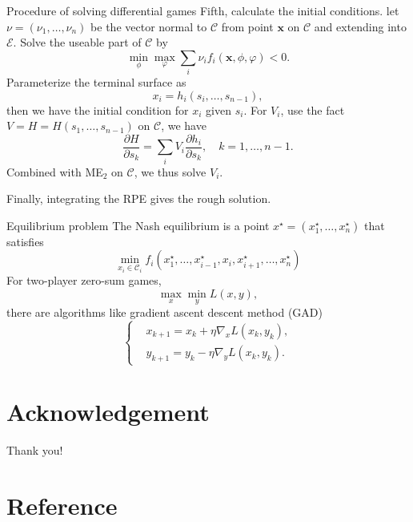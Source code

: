 \documentclass[10pt]{beamer}
\newcommand{\E}{\mathcal{E}}
\newcommand{\C}{\mathcal{C}}
\newcommand{\x}{\mathbf{x}}
\begin{document}
\begin{frame}{Procedure of solving differential games}
  Fifth, calculate the initial conditions. let $\nu = (\nu_1,\ldots,\nu_n)$ be the vector normal to $\C$ from point $\x$ on $\C$ and extending into $\E$. Solve the useable part of $\C$ by 
  \begin{equation}
    \min_{\phi} \max_{\varphi} \sum_i \nu_i f_i(\x,\phi,\varphi) < 0.
  \end{equation}
  Parameterize the terminal surface as 
  \begin{equation}
    x_i = h_i(s_i,\ldots,s_{n-1}),
  \end{equation}
  then we have the initial condition for $x_i$ given $s_i$. For $V_i$, use the fact $V = H = H(s_1,\ldots,s_{n-1})$ on $\C$, we have 
  \begin{equation}
    \frac{\partial H}{\partial s_k} = \sum_i V_i \frac{\partial h_i}{\partial s_k}, \quad k = 1,\ldots,n-1.
  \end{equation}
  Combined with ME$_2$ on $\C$, we thus solve $V_i$. \par 
  Finally, integrating the RPE gives the rough solution.
\end{frame}

\begin{frame}{Equilibrium problem}
  The Nash equilibrium is a point $x^\star = (x_1^\star,\ldots,x_n^\star)$ that satisfies 
  \begin{equation*}
    \min_{x_i\in \mathcal{C}_i} f_i(x_1^\star,\ldots, x_{i-1}^\star, x_i, x_{i+1}^\star,\ldots, x_n^\star)
  \end{equation*}
  For two-player zero-sum games, 
  \begin{equation*}
    \max_x \min_y L(x, y),
  \end{equation*}
  there are algorithms like gradient ascent descent method (GAD)
  \begin{equation*}
    \left\{\begin{aligned}
      & x_{k+1} = x_k + \eta \nabla_x L(x_k, y_k),\\
      & y_{k+1} = y_k - \eta \nabla_y L(x_k, y_k).
    \end{aligned}\right.
  \end{equation*}
\end{frame}

\section*{Acknowledgement}
\begin{frame}
\textcolor{myNewColorA}{\Huge{\centerline{Thank you!}}}
\end{frame}

\section*{Reference}
\begin{frame}
{\small


}
\end{frame}
\end{document}
